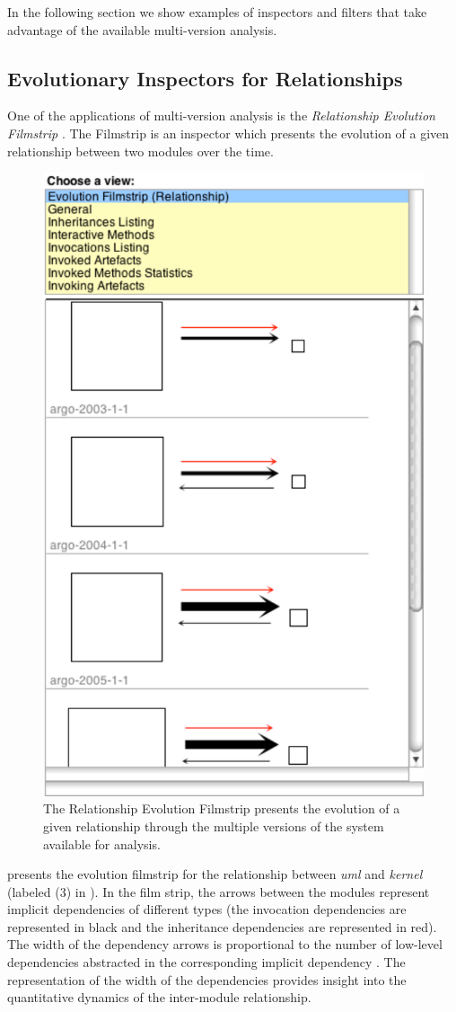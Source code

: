 \documentclass[preprint,12pt]{elsarticle}
\newcommand{\cd}[1]{{\em{#1}}}
\begin{document}
In the following section we show examples of inspectors and filters that take advantage of the available multi-version analysis. 


\subsection {Evolutionary Inspectors for Relationships}


One of the applications of multi-version analysis is the {\em Relationship Evolution Filmstrip} \cite{lungu-relevo}. The Filmstrip is an inspector which presents the evolution of a given relationship between two modules over the time. 


\begin{figure}[ht!]
\begin{center}
\includegraphics[width=0.35\linewidth]{images/Filmstrip}
\caption{The Relationship Evolution Filmstrip presents the evolution of a given relationship through the multiple versions of the system available for analysis.}
\end{center}
\end{figure}

 presents the evolution filmstrip for the relationship between \cd{uml} and \cd{kernel} (labeled (3) in ). In the film strip, the arrows between the modules represent implicit dependencies of different types (the invocation dependencies are represented in black and the inheritance dependencies are represented in red). The width of the dependency arrows is proportional to the number of low-level dependencies abstracted in the corresponding implicit dependency \cite{lungu-relevo}. The representation of the width of the dependencies provides insight into the quantitative dynamics of the inter-module relationship.
\end{document}
